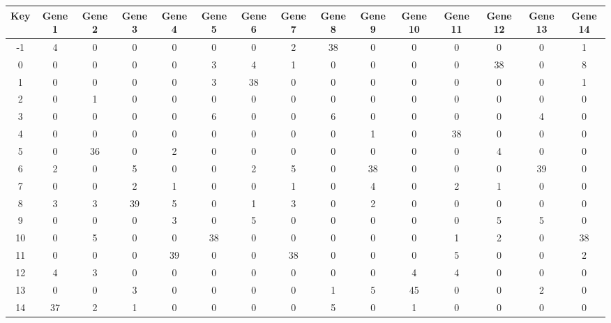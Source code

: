 \begin{tabular}{|c|c|c|c|c|c|c|c|c|c|c|c|c|c|c|}
\hline
Key & Gene 1 & Gene 2 & Gene 3 & Gene 4 & Gene 5 & Gene 6 & Gene 7 & Gene 8 & Gene 9 & Gene 10 & Gene 11 & Gene 12 & Gene 13 & Gene 14 \\
\hline
-1 & 4 & 0 & 0 & 0 & 0 & 0 & 2 & 38 & 0 & 0 & 0 & 0 & 0 & 1 \\
0 & 0 & 0 & 0 & 0 & 3 & 4 & 1 & 0 & 0 & 0 & 0 & 38 & 0 & 8 \\
1 & 0 & 0 & 0 & 0 & 3 & 38 & 0 & 0 & 0 & 0 & 0 & 0 & 0 & 1 \\
2 & 0 & 1 & 0 & 0 & 0 & 0 & 0 & 0 & 0 & 0 & 0 & 0 & 0 & 0 \\
3 & 0 & 0 & 0 & 0 & 6 & 0 & 0 & 6 & 0 & 0 & 0 & 0 & 4 & 0 \\
4 & 0 & 0 & 0 & 0 & 0 & 0 & 0 & 0 & 1 & 0 & 38 & 0 & 0 & 0 \\
5 & 0 & 36 & 0 & 2 & 0 & 0 & 0 & 0 & 0 & 0 & 0 & 4 & 0 & 0 \\
6 & 2 & 0 & 5 & 0 & 0 & 2 & 5 & 0 & 38 & 0 & 0 & 0 & 39 & 0 \\
7 & 0 & 0 & 2 & 1 & 0 & 0 & 1 & 0 & 4 & 0 & 2 & 1 & 0 & 0 \\
8 & 3 & 3 & 39 & 5 & 0 & 1 & 3 & 0 & 2 & 0 & 0 & 0 & 0 & 0 \\
9 & 0 & 0 & 0 & 3 & 0 & 5 & 0 & 0 & 0 & 0 & 0 & 5 & 5 & 0 \\
10 & 0 & 5 & 0 & 0 & 38 & 0 & 0 & 0 & 0 & 0 & 1 & 2 & 0 & 38 \\
11 & 0 & 0 & 0 & 39 & 0 & 0 & 38 & 0 & 0 & 0 & 5 & 0 & 0 & 2 \\
12 & 4 & 3 & 0 & 0 & 0 & 0 & 0 & 0 & 0 & 4 & 4 & 0 & 0 & 0 \\
13 & 0 & 0 & 3 & 0 & 0 & 0 & 0 & 1 & 5 & 45 & 0 & 0 & 2 & 0 \\
14 & 37 & 2 & 1 & 0 & 0 & 0 & 0 & 5 & 0 & 1 & 0 & 0 & 0 & 0 \\
\hline
\end{tabular}
